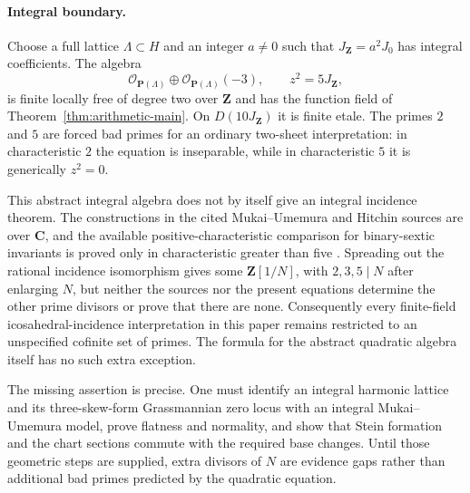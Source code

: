 \paragraph{Integral boundary.}
Choose a full lattice \(\Lambda\subset H\) and an integer \(a\ne0\) such
that \(J_{\mathbf Z}=a^2J_0\) has integral coefficients.  The algebra
\[
 \mathcal O_{\mathbf P(\Lambda)}
 \oplus\mathcal O_{\mathbf P(\Lambda)}(-3),
 \qquad z^2=5J_{\mathbf Z},
\]
is finite locally free of degree two over \(\mathbf Z\) and has the
function field of Theorem~\ref{thm:arithmetic-main}.  On
\(D(10J_{\mathbf Z})\) it is finite etale.  The primes \(2\) and \(5\)
are forced bad primes for an ordinary two-sheet interpretation: in
characteristic \(2\) the equation is inseparable, while in characteristic
\(5\) it is generically \(z^2=0\).

This abstract integral algebra does not by itself give an integral incidence
theorem.
The constructions in the cited Mukai--Umemura and Hitchin sources are over
\(\mathbf C\), and the available positive-characteristic comparison for
binary-sextic invariants is proved only in characteristic greater than five
\cite{BinaryForms}.  Spreading
out the rational incidence isomorphism gives some
\(\mathbf Z[1/N]\), with \(2,3,5\mid N\) after enlarging \(N\), but neither
the sources nor the present equations determine the other prime divisors
or prove that there are none.  Consequently every finite-field
icosahedral-incidence interpretation in this paper remains restricted to
an unspecified cofinite set of primes.  The formula for the abstract
quadratic algebra itself has no such extra exception.

The missing assertion is precise.  One must identify an integral harmonic
lattice and its three-skew-form Grassmannian zero locus with an integral
Mukai--Umemura model, prove flatness and normality, and show that Stein
formation and the chart sections commute with the required base changes.
Until those geometric steps are supplied, extra divisors of \(N\) are
evidence gaps rather than additional bad primes predicted by the quadratic
equation.
